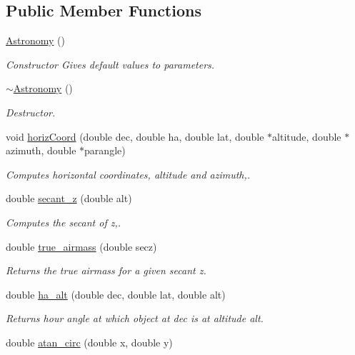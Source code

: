 \subsection*{Public Member Functions}
\begin{DoxyCompactItemize}
\item 
\hypertarget{class_astronomy_a62366a714639b3e9b08fb5769246840c}{\hyperlink{class_astronomy_a62366a714639b3e9b08fb5769246840c}{Astronomy} ()}\label{class_astronomy_a62366a714639b3e9b08fb5769246840c}

\begin{DoxyCompactList}\small\item\em Constructor Gives default values to parameters. \end{DoxyCompactList}\item 
\hypertarget{class_astronomy_a81a5125e87a916d99912178698837ad1}{\hyperlink{class_astronomy_a81a5125e87a916d99912178698837ad1}{$\sim$\-Astronomy} ()}\label{class_astronomy_a81a5125e87a916d99912178698837ad1}

\begin{DoxyCompactList}\small\item\em Destructor. \end{DoxyCompactList}\item 
void \hyperlink{class_astronomy_acbc2c4a4f5d95dff7f1c1ed533c998cb}{horiz\-Coord} (double dec, double ha, double lat, double $\ast$altitude, double $\ast$azimuth, double $\ast$parangle)
\begin{DoxyCompactList}\small\item\em Computes horizontal coordinates, altitude and azimuth,. \end{DoxyCompactList}\item 
double \hyperlink{class_astronomy_aa40f7e714fd7972d380aef12a8fb8a53}{secant\-\_\-z} (double alt)
\begin{DoxyCompactList}\small\item\em Computes the secant of z,. \end{DoxyCompactList}\item 
double \hyperlink{class_astronomy_a70f57ef9abe20b209610e088485c409a}{true\-\_\-airmass} (double secz)
\begin{DoxyCompactList}\small\item\em Returns the true airmass for a given secant z. \end{DoxyCompactList}\item 
double \hyperlink{class_astronomy_a6cafafeccaf1320085aeb2f8b555a8b8}{ha\-\_\-alt} (double dec, double lat, double alt)
\begin{DoxyCompactList}\small\item\em Returns hour angle at which object at dec is at altitude alt. \end{DoxyCompactList}\item 
\hypertarget{class_astronomy_ace5e9538970edf56c5c3f0787f0b5278}{double \hyperlink{class_astronomy_ace5e9538970edf56c5c3f0787f0b5278}{atan\-\_\-circ} (double x, double y)}\label{class_astronomy_ace5e9538970edf56c5c3f0787f0b5278}


\end{DoxyCompactItemize}
